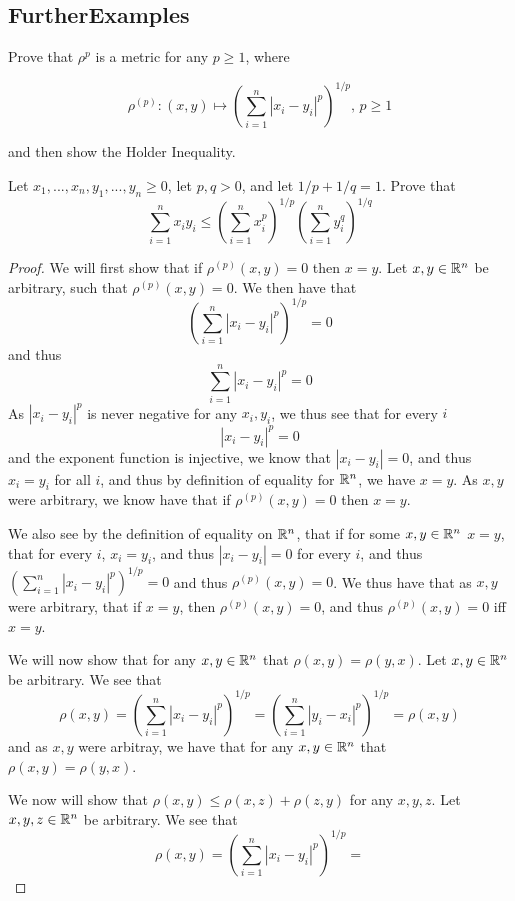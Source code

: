 \subsection{FurtherExamples}

\begin{minorEx}
  Prove that $\rho^{p}$ is a metric for any $p \geq 1$, where

$$\rho^{(p)} : (x,y) \mapsto (\sum_{i=1}^n |x_i - y_i|^p)^{1/p} \text{,   }p\geq 1$$

and then show the Holder Inequality. 

Let $x_1,...,x_n,y_1,...,y_n \geq 0$, let $p,q >0$,
and let $1/p + 1/q =1$. Prove that
$$\sum_{i=1}^n x_iy_i \leq (\sum_{i=1}^n x_i^p)^{1/p} (\sum_{i=1}^ny_i^q)^{1/q}$$
\end{minorEx}

\begin{proof}
  We will first show that if $\rho^{(p)}(x,y)=0$ then $x=y$. Let $x,y
  \in \mathbb{R}^n$ be arbitrary, such that $\rho^{(p)}(x,y)=0$. We then have that 
  $$(\sum_{i=1}^n |x_i - y_i|^p)^{1/p} =0$$
  and thus
  $$\sum_{i=1}^n |x_i - y_i|^p =0$$
  As $|x_i - y_i|^p$ is never negative for any $x_i,y_i$, we thus see
  that for every $i$
  $$|x_i - y_i|^p =0$$ and the exponent function is injective, we know
  that $|x_i - y_i|=0$, and thus $x_i=y_i$ for all $i$, and thus by
  definition of equality for $\mathbb{R}^n$, we have $x=y$. As $x,y$ were
  arbitrary, we know have that  if $\rho^{(p)}(x,y)=0$ then $x=y$.

  We also see by the definition of equality on $\mathbb{R}^n$, that if for
  some $x,y\in \mathbb{R}^n$ $x=y$, that for
  every $i$, $x_i=y_i$, and thus $|x_i-y_i|=0$ for every $i$, and thus
  $(\sum_{i=1}^n |x_i - y_i|^p)^{1/p}=0$  and thus
  $\rho^{(p)}(x,y)=0$. We thus have that as $x,y$ were arbitrary, that
  if $x=y$, then $\rho^{(p)}(x,y)=0$, and thus $\rho^{(p)}(x,y)=0$ iff
  $x=y$.

  We will now show that for any $x,y\in \mathbb{R}^n$ that
  $\rho(x,y)=\rho(y,x)$. Let $x,y\in \mathbb{R}^n$ be arbitrary.
  We see that 
  $$\rho(x,y) = 
  (\sum_{i=1}^n |x_i - y_i|^p)^{1/p}= 
  (\sum_{i=1}^n |y_i - x_i|^p)^{1/p}= 
  \rho(x,y)$$
  and as $x,y$ were arbitray, we have that 
   for any $x,y\in \mathbb{R}^n$ that
  $\rho(x,y)=\rho(y,x)$.

  We now will show that $\rho(x,y) \leq \rho(x,z) + \rho(z,y)$ for any
  $x,y,z$. Let $x,y,z \in \mathbb{R}^n$ be arbitrary. We see that 
  $$\rho(x,y)= 
  (\sum_{i=1}^n |x_i - y_i|^p)^{1/p}=$$
\end{proof}

